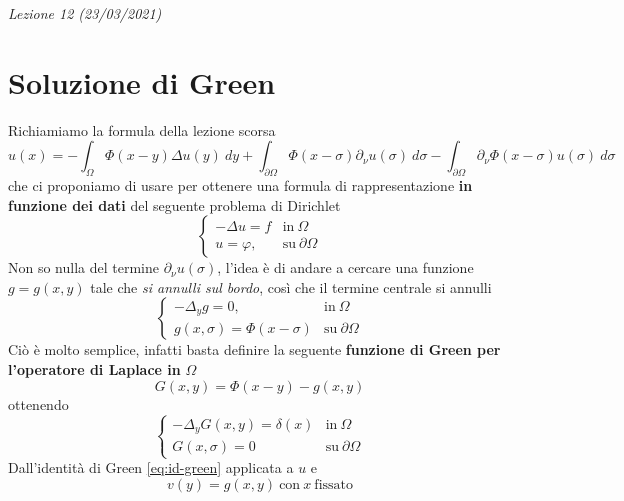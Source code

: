 \documentclass[10pt,a4paper,twoside,openright]{book}
\begin{document}
\textit{Lezione 12 (23/03/2021)}
\section{Soluzione di Green}

Richiamiamo la formula della lezione scorsa
\begin{equation}
	u( x) =-\int _{\Omega } \Phi ( x-y) \Delta u( y) \ dy+\int _{\partial \Omega } \Phi ( x-\sigma ) \partial _{\nu } u( \sigma ) \ d\sigma -\int _{\partial \Omega } \partial _{\nu } \Phi ( x-\sigma ) u( \sigma ) \ d\sigma 
	\label{eq:richiamo-formula-green}
\end{equation}
che ci proponiamo di usare per ottenere una formula di rappresentazione \textbf{in funzione dei dati} del seguente problema di Dirichlet
\begin{equation}
	\begin{cases}
		-\Delta u=f & \text{in} \ \Omega          \\
		u=\varphi , & \text{su} \ \partial \Omega 
	\end{cases}
	\label{eq:sol-green-pb-dirichlet}
\end{equation}
Non so nulla del termine $\partial _{\nu } u( \sigma )$, l'idea è di andare a cercare una funzione $g=g( x,y)$ tale che \textit{si annulli sul bordo}, così che il termine centrale si annulli
\begin{equation}
	\begin{cases}
		-\Delta _{y} g=0,                & \text{in} \ \Omega          \\
		g( x,\sigma ) =\Phi ( x-\sigma ) & \text{su} \ \partial \Omega 
	\end{cases}
	\label{eq:sol-green-pb-unico}
\end{equation}
Ciò è molto semplice, infatti basta definire la seguente \textbf{funzione di Green per l'operatore di Laplace in }$\Omega $
\begin{equation*}
	\boxed{G( x,y) =\Phi ( x-y) -g( x,y)}
\end{equation*}
ottenendo
\begin{equation*}
	\begin{cases}
		-\Delta _{y} G( x,y) =\delta ( x) & \text{in} \ \Omega          \\
		G( x,\sigma ) =0                  & \text{su} \ \partial \Omega 
	\end{cases}
\end{equation*}
Dall'identità di Green \eqref{eq:id-green} applicata a $u$ e
\begin{equation}
	v( y) =g( x,y) \ \text{con} \ x\ \text{fissato}
	\label{eq:sol-green-v-g}
\end{equation}
\end{document}
